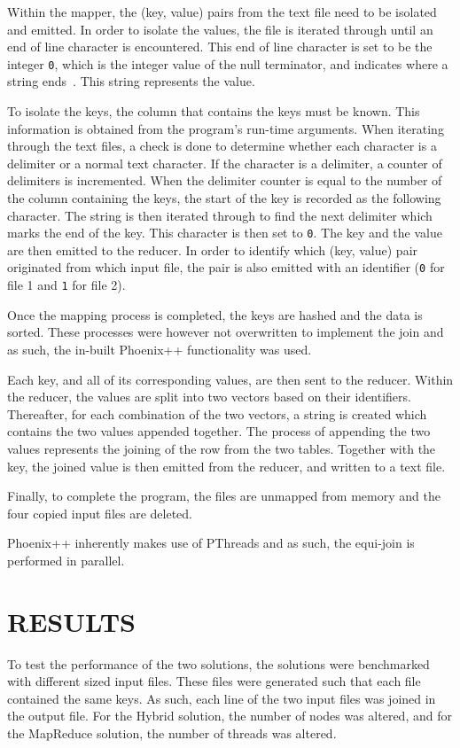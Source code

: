 \documentclass[12pt,twocolumn]{witseiepaper}
\begin{document}
Within the mapper, the (key, value) pairs from the text file need to be isolated and emitted. In order to isolate the values, the file is iterated through until an end of line character is encountered. This end of line character is set to be the integer \texttt{0}, which is the integer value of the null terminator, and indicates where a string ends~\cite{phoenix}. This string represents the value.

To isolate the keys, the column that contains the keys must be known. This information is obtained from the program's run-time arguments. When iterating through the text files, a check is done to determine whether each character is a delimiter or a normal text character. If the character is a delimiter, a counter of delimiters is incremented. When the delimiter counter is equal to the number of the column containing the keys, the start of the key is recorded as the following character. The string is then iterated through to find the next delimiter which marks the end of the key. This character is then set to \texttt{0}. The key and the value are then emitted to the reducer. In order to identify which (key, value) pair originated from which input file, the pair is also emitted with an identifier (\texttt{0} for file 1 and \texttt{1} for file 2).

Once the mapping process is completed, the keys are hashed and the data is sorted. These processes were however not overwritten to implement the join and as such, the in-built Phoenix++ functionality was used.

Each key, and all of its corresponding values, are then sent to the reducer. Within the reducer, the values are split into two vectors based on their identifiers. Thereafter, for each combination of the two vectors, a string is created which contains the two values appended together. The process of appending the two values represents the joining of the row from the two tables. Together with the key, the joined value is then emitted from the reducer, and written to a text file.

Finally, to complete the program, the files are unmapped from memory and the four copied input files are deleted.

Phoenix++ inherently makes use of PThreads and as such, the equi-join is performed in parallel.

\section{RESULTS}
To test the performance of the two solutions, the solutions were benchmarked with different sized input files. These files were generated such that each file contained the same keys. As such, each line of the two input files was joined in the output file. For the Hybrid solution, the number of nodes was altered, and for the MapReduce solution, the number of threads was altered.
\end{document}
